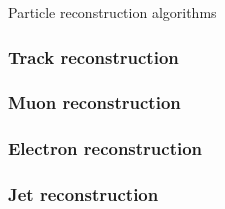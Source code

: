 Particle reconstruction algorithms

\subsubsection{Track reconstruction}\label{detector:track_reconstruction}

\subsubsection{Muon reconstruction}\label{detector:muon_reconstruction}

\subsubsection{Electron reconstruction}\label{detector:electron_reconstruction}

\subsubsection{Jet reconstruction}\label{detector:jet_reconstruction}

